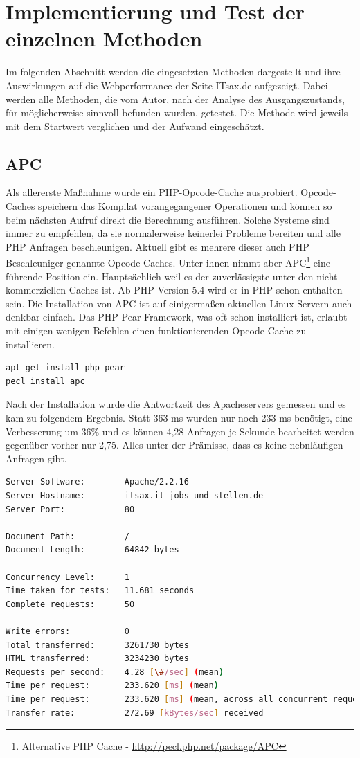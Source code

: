 \section{Implementierung und Test der einzelnen Methoden}
Im folgenden Abschnitt werden die eingesetzten Methoden dargestellt und ihre Auswirkungen auf die Webperformance der Seite ITsax.de aufgezeigt. 
Dabei werden alle Methoden, die vom Autor, nach der Analyse des Ausgangszustands, für möglicherweise sinnvoll befunden wurden, getestet. Die Methode wird jeweils mit dem Startwert verglichen und der Aufwand eingeschätzt.
\subsection{APC} Als allererste Maßnahme wurde ein PHP-Opcode-Cache ausprobiert. Opcode-Caches speichern das Kompilat vorangegangener Operationen und können so beim nächsten Aufruf direkt die Berechnung ausf\"uhren. Solche Systeme sind immer zu empfehlen, da sie normalerweise keinerlei Probleme bereiten und alle PHP Anfragen beschleunigen. Aktuell gibt es mehrere dieser auch PHP Beschleuniger genannte Opcode-Caches. Unter ihnen nimmt aber APC\footnote{Alternative PHP Cache - \url{http://pecl.php.net/package/APC}} eine führende Position ein. Hauptsächlich weil es der zuverlässigste unter den nicht-kommerziellen Caches ist. Ab PHP Version 5.4 wird er in PHP schon enthalten sein. Die Installation von APC ist auf einigermaßen aktuellen Linux Servern auch denkbar einfach. Das PHP-Pear-Framework, was oft schon installiert ist, erlaubt mit einigen wenigen Befehlen einen funktionierenden Opcode-Cache zu installieren. 
\begin{lstlisting}[language=bash,label=Installation von APC,caption=Installation von APC]
apt-get install php-pear
pecl install apc
\end{lstlisting}
Nach der Installation wurde die Antwortzeit des Apacheservers gemessen und es kam zu folgendem Ergebnis. Statt 363 ms wurden nur noch 233 ms benötigt, eine Verbesserung um 36\% und es können 4,28 Anfragen je Sekunde bearbeitet werden gegenüber vorher nur 2,75. Alles unter der Prämisse, dass es keine nebnl\"aufigen Anfragen gibt. 
\begin{lstlisting}[language=bash,label=Ausgabe von ab,caption=Ausgabe von ab]
Server Software:        Apache/2.2.16
Server Hostname:        itsax.it-jobs-und-stellen.de
Server Port:            80

Document Path:          /
Document Length:        64842 bytes

Concurrency Level:      1
Time taken for tests:   11.681 seconds
Complete requests:      50

Write errors:           0
Total transferred:      3261730 bytes
HTML transferred:       3234230 bytes
Requests per second:    4.28 [\#/sec] (mean)
Time per request:       233.620 [ms] (mean)
Time per request:       233.620 [ms] (mean, across all concurrent requests)
Transfer rate:          272.69 [kBytes/sec] received
\end{lstlisting}
